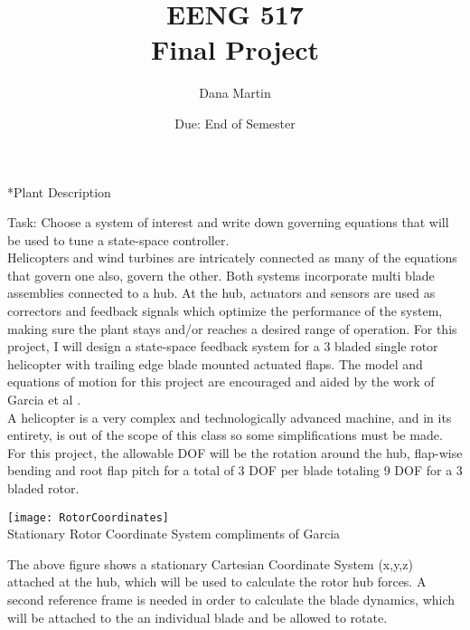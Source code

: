 \documentclass[paper=a4, fontsize=11pt]{scrartcl} %
\title{	
\normalfont \normalsize 
\textsc{EENG 517}\\ 
\huge Final Project \\ %
}
\author{Dana Martin} %
\date{\normalsize Due: End of Semester}
\numberwithin{equation}{section} %
\numberwithin{figure}{section} %
\numberwithin{table}{section} %
\begin{document}
\maketitle %

\begin{section}*{Plant Description}

	Task: Choose a system of interest and write down governing equations that will be used to tune a state-space controller.\\
	\newline
	Helicopters and wind turbines are intricately connected as many of the equations that govern one also, govern the other.  Both systems incorporate multi blade assemblies connected to a hub.  At the hub, actuators and sensors are used as correctors and feedback signals which optimize the performance of the system, making sure the plant stays and/or reaches a desired range of operation.  For this project, I will design a state-space feedback system for a 3 bladed single rotor helicopter with trailing edge blade mounted actuated flaps.  The model and equations of motion for this project are encouraged and aided by the work of Garcia et al \cite{Garcia}.\\
	
	A helicopter is a very complex and technologically advanced machine, and in its entirety, is out of the scope of this class so some simplifications must be made.  For this project, the allowable DOF will be the rotation around the hub, flap-wise bending and root flap pitch for a total of 3 DOF per blade totaling 9 DOF for a 3 bladed rotor.\\
	
	\begin{center}
	  \texttt{[image: RotorCoordinates]}\\
	 {Stationary Rotor Coordinate System compliments of Garcia \cite{Garcia}}
	  \label{RotorCoordinates:RotorCoordinateSystem1}
	\end{center}
	
	The above figure shows a stationary Cartesian Coordinate System (x,y,z) attached at the hub, which will be used to calculate the rotor hub forces.  A second reference frame is needed in order to calculate the blade dynamics, which will be attached to the an individual blade and be allowed to rotate.    
	

\end{section}
\end{document}
